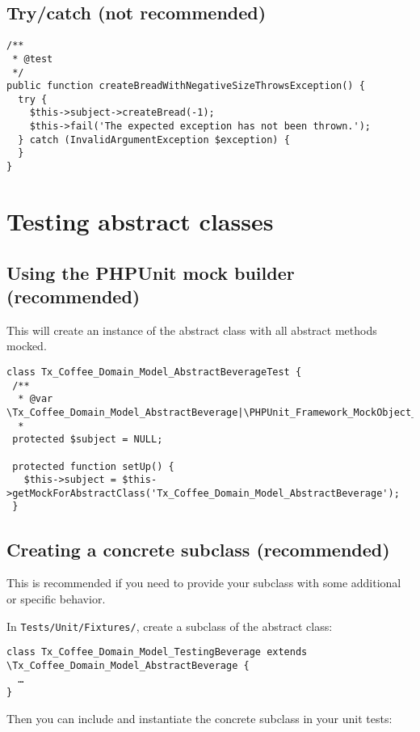 \documentclass[a4paper,twoside,landscape]{scrartcl}
\begin{document}
\subsection{Try/catch (not recommended)}
\small
\begin{verbatim}
/**
 * @test
 */
public function createBreadWithNegativeSizeThrowsException() {
  try {
    $this->subject->createBread(-1);
    $this->fail('The expected exception has not been thrown.');
  } catch (InvalidArgumentException $exception) {
  }
}
\end{verbatim}
\normalsize

\newpage

\section{Testing abstract classes}

\subsection{Using the PHPUnit mock builder (recommended)}

This will create an instance of the abstract class with all abstract methods mocked.

\small
\begin{verbatim}
class Tx_Coffee_Domain_Model_AbstractBeverageTest {
 /**
  * @var \Tx_Coffee_Domain_Model_AbstractBeverage|\PHPUnit_Framework_MockObject_MockObject
  *
 protected $subject = NULL;

 protected function setUp() {
   $this->subject = $this->getMockForAbstractClass('Tx_Coffee_Domain_Model_AbstractBeverage');
 }
\end{verbatim}
\normalsize

\subsection{Creating a concrete subclass (recommended)}
This is recommended if you need to provide your subclass with some additional or specific behavior.

In \texttt{Tests/Unit/Fixtures/}, create a subclass of the abstract class:

\small
\begin{verbatim}
class Tx_Coffee_Domain_Model_TestingBeverage extends \Tx_Coffee_Domain_Model_AbstractBeverage {
  …
}
\end{verbatim}
\normalsize

Then you can include and instantiate the concrete subclass in your unit tests:
\end{document}
